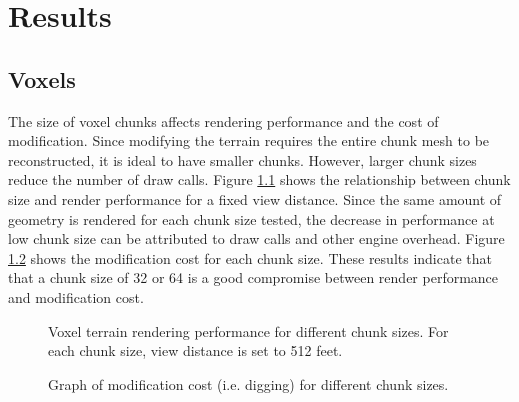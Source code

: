
\iffalse  \fi

\chapter{Results}


\section{Voxels}

The size of voxel chunks affects rendering performance and the cost of modification.
Since modifying the terrain requires the entire chunk mesh to be reconstructed, it is ideal to have smaller chunks.
However, larger chunk sizes reduce the number of draw calls.
Figure \ref{fig:voxel_plot_1} shows the relationship between chunk size and render performance for a fixed view distance.
Since the same amount of geometry is rendered for each chunk size tested, the decrease in performance at low chunk size can be attributed to draw calls and other engine overhead.
Figure \ref{fig:voxel_plot_2} shows the modification cost for each chunk size.
These results indicate that that a chunk size of 32 or 64 is a good compromise between render performance and modification cost.

\begin{figure}
	\centering
{}
	\caption{
		Voxel terrain rendering performance for different chunk sizes.
		For each chunk size, view distance is set to 512 feet.
	}
	\label{fig:voxel_plot_1}
\end{figure}

\begin{figure}
	\centering
{}
	\caption{
		Graph of modification cost (i.e. digging) for different chunk sizes.
	}
	\label{fig:voxel_plot_2}
\end{figure}


